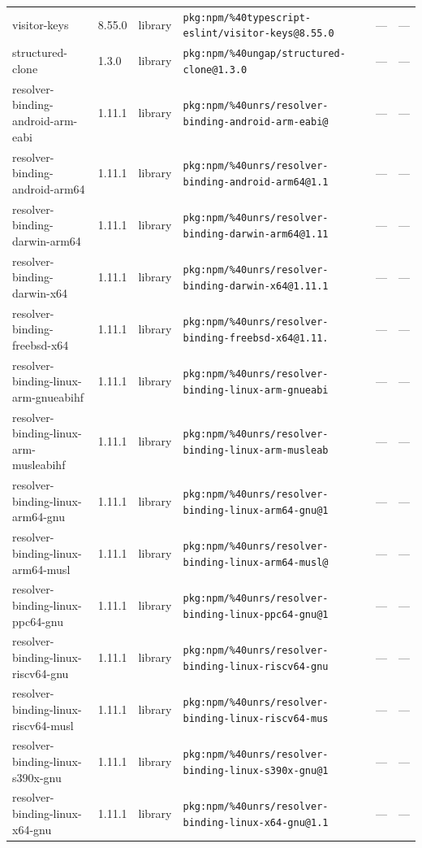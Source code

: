 \documentclass[11pt]{article}
\begin{document}
\begin{longtable}{|l|l|l|p{2.2cm}|l|p{4cm}|}
visitor-keys & 8.55.0 & library & \texttt{pkg:npm/\%40typescript-eslint/visitor-keys@8.55.0} & — & — \\
structured-clone & 1.3.0 & library & \texttt{pkg:npm/\%40ungap/structured-clone@1.3.0} & — & — \\
resolver-binding-android-arm-eabi & 1.11.1 & library & \texttt{pkg:npm/\%40unrs/resolver-binding-android-arm-eabi@} & — & — \\
resolver-binding-android-arm64 & 1.11.1 & library & \texttt{pkg:npm/\%40unrs/resolver-binding-android-arm64@1.1} & — & — \\
resolver-binding-darwin-arm64 & 1.11.1 & library & \texttt{pkg:npm/\%40unrs/resolver-binding-darwin-arm64@1.11} & — & — \\
resolver-binding-darwin-x64 & 1.11.1 & library & \texttt{pkg:npm/\%40unrs/resolver-binding-darwin-x64@1.11.1} & — & — \\
resolver-binding-freebsd-x64 & 1.11.1 & library & \texttt{pkg:npm/\%40unrs/resolver-binding-freebsd-x64@1.11.} & — & — \\
resolver-binding-linux-arm-gnueabihf & 1.11.1 & library & \texttt{pkg:npm/\%40unrs/resolver-binding-linux-arm-gnueabi} & — & — \\
resolver-binding-linux-arm-musleabihf & 1.11.1 & library & \texttt{pkg:npm/\%40unrs/resolver-binding-linux-arm-musleab} & — & — \\
resolver-binding-linux-arm64-gnu & 1.11.1 & library & \texttt{pkg:npm/\%40unrs/resolver-binding-linux-arm64-gnu@1} & — & — \\
resolver-binding-linux-arm64-musl & 1.11.1 & library & \texttt{pkg:npm/\%40unrs/resolver-binding-linux-arm64-musl@} & — & — \\
resolver-binding-linux-ppc64-gnu & 1.11.1 & library & \texttt{pkg:npm/\%40unrs/resolver-binding-linux-ppc64-gnu@1} & — & — \\
resolver-binding-linux-riscv64-gnu & 1.11.1 & library & \texttt{pkg:npm/\%40unrs/resolver-binding-linux-riscv64-gnu} & — & — \\
resolver-binding-linux-riscv64-musl & 1.11.1 & library & \texttt{pkg:npm/\%40unrs/resolver-binding-linux-riscv64-mus} & — & — \\
resolver-binding-linux-s390x-gnu & 1.11.1 & library & \texttt{pkg:npm/\%40unrs/resolver-binding-linux-s390x-gnu@1} & — & — \\
resolver-binding-linux-x64-gnu & 1.11.1 & library & \texttt{pkg:npm/\%40unrs/resolver-binding-linux-x64-gnu@1.1} & — & — \\

\end{longtable}
\end{document}
